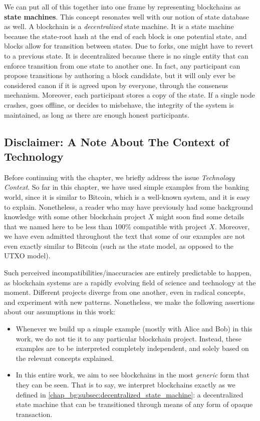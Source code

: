 We can put all of this together into one frame by representing blockchains as \textbf{state
machines}. This concept resonates well with our notion of state database as well. A blockchain is a
\textit{decentralized} state machine. It is a state machine because the state-root hash at the end
of each block is one potential state, and blocks allow for transition between states. Due to forks,
one might have to revert to a previous state. It is decentralized because there is no single entity
that can enforce transition from one state to another one. In fact, any participant can propose
transitions by authoring a block candidate, but it will only ever be considered canon if it is
agreed upon by everyone, through the consensus mechanism. Moreover, each participant stores a copy
of the state. If a single node crashes, goes offline, or decides to misbehave, the integrity of the
system is maintained, as long as there are enough honest participants.


\subsection{Disclaimer: A Note About The Context of Technology}

Before continuing with the chapter, we briefly address the issue \textit{Technology Context}. So far
in this chapter, we have used simple examples from the banking world, since it is similar to Bitcoin,
which is a well-known system, and it is easy to explain. Nonetheless, a reader who may have
previously had some background knowledge with some other blockchain project $X$ might soon find some
details that we named here to be less than 100\% compatible with project $X$. Moreover, we
have even admitted throughout the text that some of our examples are not even exactly similar to
Bitcoin (such as the state model, as opposed to the UTXO model).

Such perceived incompatibilities/inaccuracies are entirely predictable to happen, as blockchain systems are a rapidly evolving field of
science and technology at the moment. Different projects diverge from one another, even in radical
concepts, and experiment with new patterns. Nonetheless, we make the following assertions about our
assumptions in this work:

\begin{itemize}
	\item Whenever we build up a simple example (mostly with Alice and Bob) in this work, we do not
	tie it to any particular blockchain project. Instead, these examples are to be interpreted
	completely independent, and solely based on the relevant concepts explained.
	\item In this entire work, we aim to see blockchains in the most \textit{generic} form that they can be seen. That is to say, we interpret blockchains exactly as we defined in \ref{chap_bg:subsec:decentralized_state_machine}: a decentralized state machine that can be
	transitioned through means of any form of opaque transaction.
\end{itemize}

